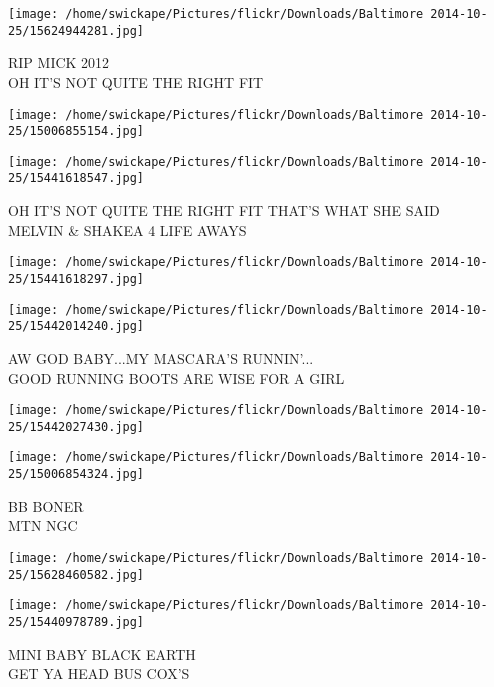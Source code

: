 \documentclass[10pt,letterpaper]{article}
\begin{document}
\vspace{0.25in}
\texttt{[image: /home/swickape/Pictures/flickr/Downloads/Baltimore 2014-10-25/15624944281.jpg]}

RIP MICK 2012\\
OH IT'S NOT QUITE THE RIGHT FIT\\
\pagebreak

\texttt{[image: /home/swickape/Pictures/flickr/Downloads/Baltimore 2014-10-25/15006855154.jpg]}

\vspace{0.25in}
\texttt{[image: /home/swickape/Pictures/flickr/Downloads/Baltimore 2014-10-25/15441618547.jpg]}

OH IT'S NOT QUITE THE RIGHT FIT THAT'S WHAT SHE SAID\\
MELVIN \& SHAKEA 4 LIFE AWAYS\\
\pagebreak

\texttt{[image: /home/swickape/Pictures/flickr/Downloads/Baltimore 2014-10-25/15441618297.jpg]}

\vspace{0.25in}
\texttt{[image: /home/swickape/Pictures/flickr/Downloads/Baltimore 2014-10-25/15442014240.jpg]}

AW GOD BABY...MY MASCARA'S RUNNIN'...\\
GOOD RUNNING BOOTS ARE WISE FOR A GIRL\\
\pagebreak

\texttt{[image: /home/swickape/Pictures/flickr/Downloads/Baltimore 2014-10-25/15442027430.jpg]}

\vspace{0.25in}
\texttt{[image: /home/swickape/Pictures/flickr/Downloads/Baltimore 2014-10-25/15006854324.jpg]}

BB BONER\\
MTN NGC\\
\pagebreak

\texttt{[image: /home/swickape/Pictures/flickr/Downloads/Baltimore 2014-10-25/15628460582.jpg]}

\vspace{0.25in}
\texttt{[image: /home/swickape/Pictures/flickr/Downloads/Baltimore 2014-10-25/15440978789.jpg]}

MINI BABY BLACK EARTH\\
GET YA HEAD BUS COX'S\\
\pagebreak
\end{document}
